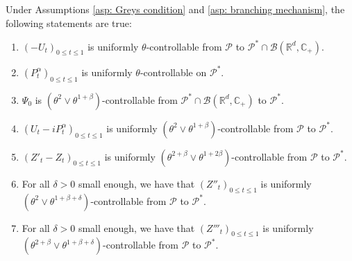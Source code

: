 \documentclass[EJP]{ejpecp} %
\begin{document}
\begin{lemma}
  \label{lem: upper bound for usgx}
  Under Assumptions \ref{asp: Greys condition} and \ref{asp: branching mechanism}, the following statements are true:
  \begin{enumerate}
  \item
    $(-U_t)_{0\leq t\leq 1}$ is uniformly $\theta$-controllable from $\mathcal P$ to $\mathcal P^*\cap \mathcal B(\mathbb R^d, \mathbb C_+)$.
  \item
    $(P^\alpha_t)_{0\leq t\leq 1}$ is uniformly $\theta$-controllable on $\mathcal P^*$.
  \item
    $\Psi_0$ is $(\theta^2\vee \theta^{1+\beta})$-controllable from $\mathcal P^* \cap \mathcal B(\mathbb R^d, \mathbb C_+)$ to $\mathcal P^*$.
  \item
    $(U_t- iP_t^{\alpha})_{0\leq t\leq 1}$ is uniformly $(\theta^2\vee \theta^{1+\beta})$-controllable from $\mathcal P$ to $\mathcal P^*$.
  \item
    $(Z'_t-Z_t)_{0\leq t\leq 1}$ is uniformly $(\theta^{2+\beta}\vee \theta^{1+2\beta})$-controllable from $\mathcal P$ to $\mathcal P^*$.
  \item
    For all $\delta > 0$ small enough, we have that $(Z''_t)_{0\leq t\leq 1}$ is uniformly $(\theta^2\vee \theta^{1+\beta+\delta})$-controllable from $\mathcal P$ to $\mathcal P^*$.
  \item
    For all $\delta > 0$ small enough, we have that $(Z'''_t)_{0\leq t\leq 1}$ is uniformly $(\theta^{2+\beta}\vee \theta^{1+\beta+\delta})$-controllable from $\mathcal P$ to $\mathcal P^*$.
  \end{enumerate}
\end{lemma}
\end{document}
